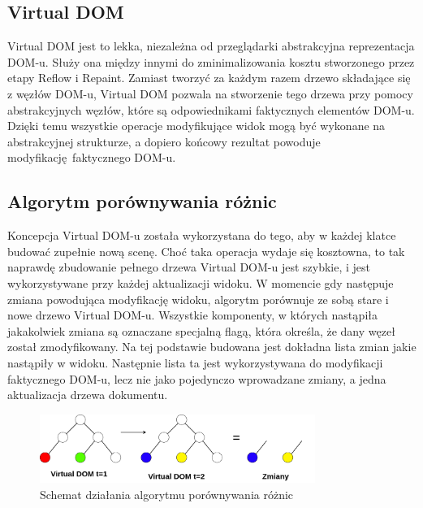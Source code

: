 \subsection{Virtual DOM}
Virtual DOM jest to lekka, niezależna od przeglądarki abstrakcyjna reprezentacja DOM-u. Służy ona między innymi do zminimalizowania kosztu stworzonego przez etapy Reflow i Repaint. Zamiast tworzyć za każdym razem drzewo składające się z węzłów DOM-u, Virtual DOM pozwala na stworzenie tego drzewa przy pomocy abstrakcyjnych węzłów, które są odpowiednikami faktycznych elementów DOM-u. Dzięki temu wszystkie operacje modyfikujące widok mogą być wykonane na abstrakcyjnej strukturze, a dopiero końcowy rezultat powoduje modyfikację faktycznego DOM-u.

\subsection{Algorytm porównywania różnic}
Koncepcja Virtual DOM-u została wykorzystana do tego, aby w każdej klatce budować zupełnie nową scenę. Choć taka operacja wydaje się kosztowna, to tak naprawdę zbudowanie pełnego drzewa Virtual DOM-u jest szybkie, i jest wykorzystywane przy każdej aktualizacji widoku. W momencie gdy następuje zmiana powodująca modyfikację widoku, algorytm porównuje ze sobą stare i nowe drzewo Virtual DOM-u. Wszystkie komponenty, w których nastąpiła jakakolwiek zmiana są oznaczane specjalną flagą, która określa, że dany węzeł został zmodyfikowany. Na tej podstawie budowana jest dokładna lista zmian jakie nastąpiły w widoku. Następnie lista ta jest wykorzystywana do modyfikacji faktycznego DOM-u, lecz nie jako pojedynczo wprowadzane zmiany, a jedna aktualizacja drzewa dokumentu. 

\begin{figure}[h]
	\centering
	\includegraphics[width=0.8\textwidth]{images/diff_algorithm}
	\caption{Schemat działania algorytmu  porównywania różnic}
	\label{fig:diffAlgorithm}
\end{figure}

